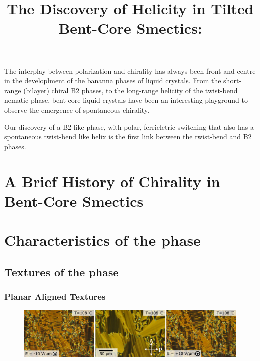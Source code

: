 \documentclass[defaultstyle,11pt]{article}
\title{The Discovery of Helicity in Tilted Bent-Core Smectics: \smcpalpha{}}
\begin{document}
\maketitle
The interplay between polarization and chirality has always been front and
centre in the developlment of the bananna phases of liquid crystals. From the
short-range (bilayer) chiral B2 phases\cite{link}, to the
long-range helicity of the twist-bend nematic phase, bent-core liquid crystals
have been an interesting playground to observe the emergence of spontaneous
chirality.

Our discovery of a B2-like phase, with polar, ferrieletric switching that also
has a spontaneous twist-bend like helix is the first link between the
twist-bend and B2 phases. 









\section{A Brief History of Chirality in Bent-Core Smectics}
\section{Characteristics of the \smcpalpha{} phase}



\subsection{Textures of the \smcpalpha{} phase}
\subsubsection{Planar Aligned Textures}
\begin{figure}
    \centering
    \includegraphics[width=\textwidth]{figs/pal30/textureSM2/sm2Textures100.png}
\end{figure}
\end{document}
